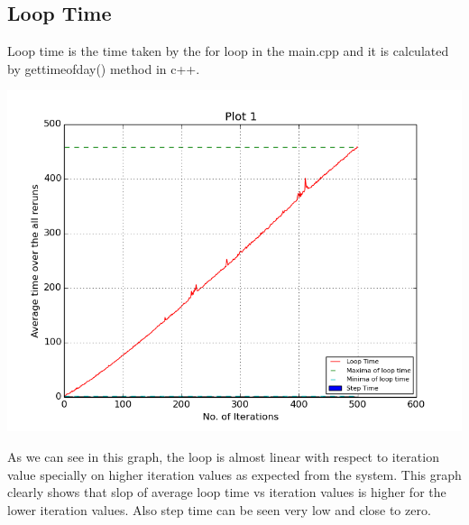 \documentclass[11pt]{article}
\begin{document}
\subsection{Loop Time}
Loop time is the time taken by the for loop in the main.cpp and it is calculated by gettimeofday() method in c++.
\begin{center}
\includegraphics[scale=0.5]{g12_plot01}
\end{center}
As we can see in this graph, the loop is almost linear with respect to iteration value specially on higher iteration values as expected from the system. This graph clearly shows that slop of average loop time vs iteration values is higher for the lower iteration values.
Also step time can be seen very low and close to zero.
\end{document}
